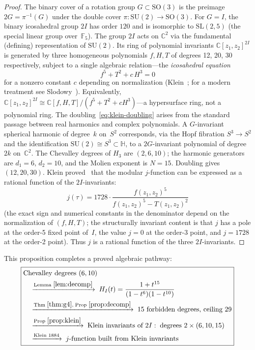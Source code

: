 \documentclass[11pt,letterpaper]{article}
\theoremstyle{definition}
\newcommand{\HH}{\mathbb{H}}
\begin{document}
\begin{proof}
The binary cover of a rotation group $G\subset\mathrm{SO}(3)$ is the preimage $2G = \pi^{-1}(G)$ under the double cover $\pi:\mathrm{SU}(2)\to\mathrm{SO}(3)$.  For $G=I$, the binary icosahedral group $2I$ has order $120$ and is isomorphic to $\mathrm{SL}(2,5)$ (the special linear group over~$\mathbb{F}_5$).
The group $2I$ acts on $\mathbb{C}^2$ via the fundamental (defining) representation of $\mathrm{SU}(2)$.  Its ring of polynomial invariants $\mathbb{C}[z_1,z_2]^{2I}$ is generated by three homogeneous polynomials $f,H,T$ of degrees 12, 20, 30 respectively, subject to a single algebraic relation---the \emph{icosahedral equation}
\begin{equation}\label{eq:icosa-eqn-klein}
  f^5 + T^2 + c\,H^3 = 0
\end{equation}
for a nonzero constant $c$ depending on normalization (Klein~\cite{Klein1884}; for a modern treatment see Slodowy~\cite{Slodowy1980}).  Equivalently, $\mathbb{C}[z_1,z_2]^{2I}\cong\mathbb{C}[f,H,T]/(f^5{+}T^2{+}cH^3)$---a hypersurface ring, not a polynomial ring.
The doubling~\eqref{eq:klein-doubling} arises from the standard passage between real harmonics and complex polynomials.  A $G$-invariant spherical harmonic of degree~$k$ on~$S^2$ corresponds, via the Hopf fibration $S^3\to S^2$ and the identification $\mathrm{SU}(2)\cong S^3\subset\HH$, to a $2G$-invariant polynomial of degree~$2k$ on~$\mathbb{C}^2$.  The Chevalley degrees of $H_3$ are $(2,6,10)$; the harmonic generators are $d_1=6$, $d_2=10$, and the Molien exponent is $N=15$.  Doubling gives $(12,20,30)$.
Klein proved~\cite{Klein1884} that the modular $j$-function can be expressed as a rational function of the $2I$-invariants:
\[
  j(\tau) = 1728\cdot\frac{f(z_1,z_2)^5}{f(z_1,z_2)^5 - T(z_1,z_2)^2}
\]
(the exact sign and numerical constants in the denominator depend on the normalization of $(f,H,T)$; the structurally invariant content is that $j$ has a pole at the order-5 fixed point of~$I$, the value $j=0$ at the order-3 point, and $j=1728$ at the order-2 point).  Thus $j$ is a rational function of the three $2I$-invariants.
\end{proof}
This proposition completes a proved algebraic pathway:
\begin{equation}\label{eq:chain}
\boxed{
\begin{aligned}
  &\text{Chevalley degrees }(6,10)\\
  &\quad\xrightarrow{\text{Lemma }\ref{lem:decomp}}\; H_I(t) = \frac{1+t^{15}}{(1-t^6)(1-t^{10})}\\
  &\quad\xrightarrow{\text{Thm }\ref{thm:g4},\;\text{Prop }\ref{prop:decomp}}\; 15\text{ forbidden degrees, ceiling }29\\
  &\quad\xrightarrow{\text{Prop }\ref{prop:klein}}\; \text{Klein invariants of }2I:\;\text{degrees }2\times(6,10,15)\\
  &\quad\xrightarrow{\text{Klein 1884}}\; j\text{-function built from Klein invariants}
\end{aligned}}
\end{equation}
\end{document}

